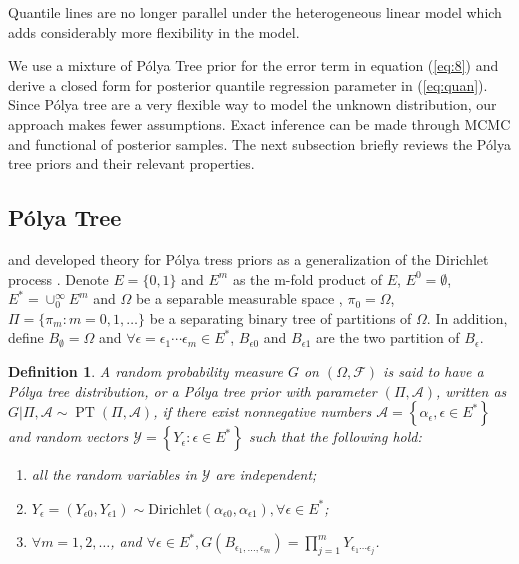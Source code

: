 \documentclass[12pt]{article}
\newtheorem{deff}[thm]{Definition}
\newcommand{\polya}{P\'{o}lya}
\DeclareMathOperator{\pt}{PT}
\begin{document}
Quantile lines are no longer parallel under the heterogeneous linear
model which adds considerably more flexibility in the model.

We use a mixture of \polya{} Tree prior for the error term in equation
(\ref{eq:8}) and derive a closed form for posterior quantile
regression parameter in (\ref{eq:quan}).  Since \polya{} tree are a very
flexible way to model the unknown distribution, our approach makes
fewer assumptions.  Exact inference can be made through MCMC and
functional of posterior samples. The next subsection briefly reviews
the \polya{} tree priors and their relevant properties.

\subsection{\polya{} Tree}
\citet{lavine1992, lavine1994} and \citet{mauldin1992} developed
theory for \polya{} tress priors as a generalization of the Dirichlet
process \citep{ferguson1974}. Denote $E=\{0,1\}$ and $E^m$ as the
m-fold product of $E$, $E^0= \emptyset$, $E^{*} = \cup_0^{\infty} E^m$
and $\Omega$ be a separable measurable space , $\pi_0 = \Omega$, $\Pi=
\{ \pi_m: m=0,1, \ldots \} $ be a separating binary tree of partitions
of $\Omega$. In addition, define $B_{\emptyset} = \Omega$ and $\forall
\epsilon=\epsilon_1\cdots \epsilon_m \in E^{*}$, $B_{\epsilon 0}$ and
$B_{\epsilon 1}$ are the two partition of $B_{\epsilon}$.
\begin{deff}
  A random probability measure $G$ on $(\Omega, \mathcal{F})$ is said
  to have a \polya{} tree distribution, or a \polya{} tree prior with
  parameter $(\Pi, \mathcal{A})$, written as $G|\Pi, \mathcal{A} \sim
  \pt (\Pi, \mathcal{A})$, if there exist nonnegative numbers
  $\mathcal{A}= \left\{ \alpha_{\epsilon}, \epsilon \in E^{*}
  \right\}$ and random vectors $\mathcal{Y} = \left\{ Y_{\epsilon} :
    \epsilon \in E^{*} \right\}$ such that the following hold:
  \begin{enumerate}
  \item\label{item:1} all the random variables in $\mathcal{Y}$ are
    independent;
  \item $Y_{\epsilon}= (Y_{\epsilon 0} , Y_{\epsilon 1}) \sim
    \mathrm{Dirichlet}(\alpha_{\epsilon 0 }, \alpha_{\epsilon 1}),
    \forall \epsilon \in E^{*}$;
  \item $\forall m=1,2, \ldots$, and $\forall \epsilon \in E^{*},
    G(B_{\epsilon_{1}, \ldots, \epsilon_m}) = \prod_{j=1}^m
    Y_{\epsilon_1 \cdots \epsilon_j}$.
  \end{enumerate}
\end{deff}
\end{document}
